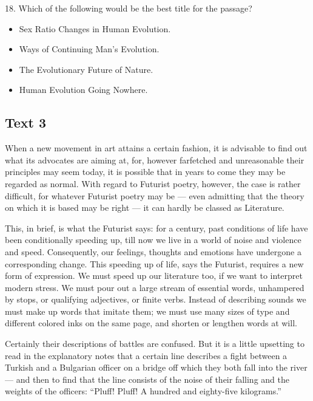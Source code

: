\documentclass[UTF8,11pt]{ctexart}
\begin{document}
18. Which of the following would be the best title for the passage?


\begin{itemize}[leftmargin=2em,itemsep=.2em,topsep=.4em]\item[A.] Sex Ratio Changes in Human Evolution.
\item[B.] Ways of Continuing Man’s Evolution.
\item[C.] The Evolutionary Future of Nature.
\item[D.] Human Evolution Going Nowhere.
\end{itemize}

\subsection*{\textbf{Text 3}}


When a new movement in art attains a certain fashion, it is advisable to find out what its advocates are aiming at, for, however farfetched and unreasonable their principles may seem today, it is possible that in years to come they may be regarded as normal. With regard to Futurist poetry, however, the case is rather difficult, for whatever Futurist poetry may be — even admitting that the theory on which it is based may be right — it can hardly be classed as Literature.


This, in brief, is what the Futurist says: for a century, past conditions of life have been conditionally speeding up, till now we live in a world of noise and violence and speed. Consequently, our feelings, thoughts and emotions have undergone a corresponding change. This speeding up of life, says the Futurist, requires a new form of expression. We must speed up our literature too, if we want to interpret modern stress. We must pour out a large stream of essential words, unhampered by stops, or qualifying adjectives, or finite verbs. Instead of describing sounds we must make up words that imitate them; we must use many sizes of type and different colored inks on the same page, and shorten or lengthen words at will.


Certainly their descriptions of battles are confused. But it is a little upsetting to read in the explanatory notes that a certain line describes a fight between a Turkish and a Bulgarian officer on a bridge off which they both fall into the river — and then to find that the line consists of the noise of their falling and the weights of the officers: “Pluff! Pluff! A hundred and eighty-five kilograms.”
\end{document}
